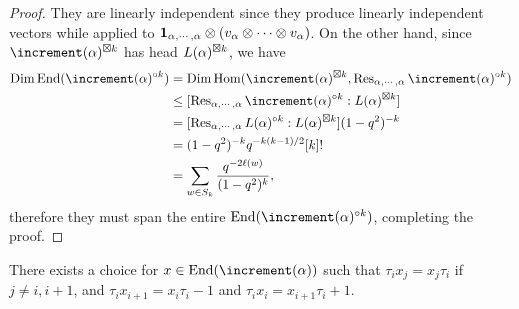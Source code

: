 \begin{proof}
    They are linearly independent since they produce linearly independent
    vectors while applied to $\mathbf{1}_{\alpha,\cdots,\alpha}\otimes
    (v_\alpha\otimes\cdots\otimes v_\alpha)$. On the other hand, since
    $\std(\alpha)^{\ex k}$ has head $L(\alpha)^{\boxtimes k}$, we have
    \[
    \begin{aligned}
        \Dim\End(\std(\alpha)^{\circ k})
        & = \Dim\Hom(\std(\alpha)^{\ex k},
        \Res_{\alpha,\cdots,\alpha}\std(\alpha)^{\circ k})\\
        &\le[\Res_{\alpha,\cdots,\alpha}\std(\alpha)^{\circ k}
        :L(\alpha)^{\ex k}]\\
        & = [\Res_{\alpha,\cdots,\alpha}L(\alpha)^{\circ k}
        :L(\alpha)^{\ex k}](1-q^2)^{-k}\\
        & = (1-q^2)^{-k}q^{-k(k-1)/2}[k]!\\
        & = \sum_{w\in S_k}\dfrac{q^{-2\ell(w)}}{(1-q^2)^k},
    \end{aligned}
    \]
    therefore they must span the entire $\End(\std(\alpha)^{\circ k})$,
    completing the proof.
\end{proof}

\begin{lemma}
    There exists a choice for $x\in\End(\std(\alpha))$ such that
    $\tau_i x_j = x_j\tau_i$ if $j\ne i,i+1$, and $\tau_i x_{i+1}
     = x_i\tau_i-1$ and $\tau_i x_i = x_{i+1}\tau_i+1$.
\end{lemma}

